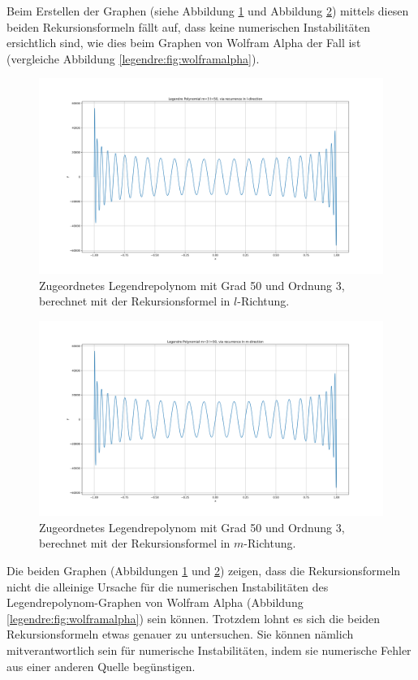 Beim Erstellen der Graphen (siehe Abbildung \ref{legendre:fig:plot-l} und Abbildung \ref{legendre:fig:plot-m}) mittels diesen beiden Rekursionsformeln fällt auf, dass keine numerischen Instabilitäten ersichtlich sind, wie dies beim Graphen von Wolfram Alpha der Fall ist (vergleiche Abbildung \ref{legendre:fig:wolframalpha}).
\begin{figure}[!h]
\centering
\includegraphics[width=1.0\linewidth]{papers/legendre/plots/plot_l}
\caption{Zugeordnetes Legendrepolynom mit Grad 50 und Ordnung 3, berechnet mit der Rekursionsformel in \texorpdfstring{$l$}{l}-Richtung.}
\label{legendre:fig:plot-l}
\end{figure}
\begin{figure}[!h]
\centering
\includegraphics[width=1.0\linewidth]{papers/legendre/plots/plot_m}
\caption{Zugeordnetes Legendrepolynom mit Grad 50 und Ordnung 3, berechnet mit der Rekursionsformel in \texorpdfstring{$m$}{m}-Richtung.}
\label{legendre:fig:plot-m}
\end{figure}
Die beiden Graphen (Abbildungen \ref{legendre:fig:plot-l} und \ref{legendre:fig:plot-m}) zeigen, dass die Rekursionsformeln nicht die alleinige Ursache für die numerischen Instabilitäten des Legendrepolynom-Graphen von Wolfram Alpha (Abbildung \ref{legendre:fig:wolframalpha}) sein können.
Trotzdem lohnt es sich die beiden Rekursionsformeln etwas genauer zu untersuchen.
Sie können nämlich mitverantwortlich sein für numerische Instabilitäten, indem sie numerische Fehler aus einer anderen Quelle begünstigen.
